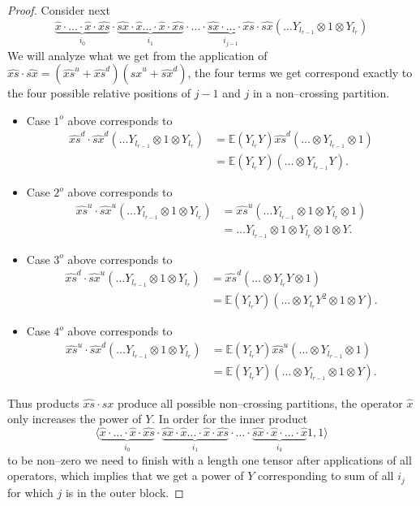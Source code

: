 \documentclass{amsart}
\newcommand{\bE}{\mathbb{E}}
\begin{document}
\begin{proof}
Consider next
\[\underbrace{\widehat{x}\cdot\ldots\cdot \widehat{x} \cdot \widehat{xs}}_{i_0}
 \cdot \underbrace{\widehat{sx}\cdot \widehat{x}\ldots\cdot \widehat{x} \cdot \widehat{xs}}_{i_1}
 \cdot\ldots\cdot \underbrace{\widehat{sx}\cdot\ldots\cdot \widehat{xs} }_{i_{j-1}}\cdot \widehat{sx} (\ldots Y_{l_{r-1}}\otimes 1 \otimes Y_{l_{r}})\]
We will analyze what we get from the application of $\widehat{xs}\cdot \widehat{sx}=(\widehat{xs}^u+\widehat{xs}^d)(\widehat{sx}^u+\widehat{sx}^d)$, the four terms we get correspond exactly to the four possible relative positions of $j-1$ and $j$ in a non--crossing partition.
\begin{itemize}
	\item Case $1^o$ above corresponds to 
	\begin{align*}
		\widehat{xs}^d\cdot \widehat{sx}^d (\ldots Y_{l_{r-1}}\otimes 1 \otimes Y_{l_{r}})&=\bE(Y_{l_{r}}Y)\widehat{xs}^d( \ldots\otimes Y_{l_{r-1}} \otimes 1)\\
		&=\bE(Y_{l_{r}}Y)( \ldots\otimes Y_{l_{r-1}}Y ).
	\end{align*}
	\item Case $2^o$ above corresponds to 
	\begin{align*}
		\widehat{xs}^u\cdot \widehat{sx}^u (\ldots Y_{l_{r-1}}\otimes 1 \otimes Y_{l_{r}})&=\widehat{xs}^u(\ldots Y_{l_{r-1}}\otimes 1 \otimes Y_{l_{r}}\otimes 1)\\
		&=\ldots Y_{l_{r-1}}\otimes 1 \otimes Y_{l_{r}}\otimes 1\otimes Y.
	\end{align*}
	\item Case $3^o$ above corresponds to 
	\begin{align*}
		\widehat{xs}^d\cdot \widehat{sx}^u (\ldots Y_{l_{r-1}}\otimes 1 \otimes Y_{l_{r}})&=\widehat{xs}^d( \ldots\otimes Y_{l_{r}}Y \otimes 1)\\
		&=\bE(Y_{l_{r}}Y)( \ldots\otimes Y_{l_{r}}Y^2 \otimes 1\otimes Y).
	\end{align*}
	\item Case $4^o$ above corresponds to 
	\begin{align*}
		\widehat{xs}^u\cdot \widehat{sx}^d (\ldots Y_{l_{r-1}}\otimes 1 \otimes Y_{l_{r}})&=\bE(Y_{l_{r}}Y)\widehat{xs}^u( \ldots\otimes Y_{l_{r-1}} \otimes 1)\\
		&=\bE(Y_{l_{r}}Y)( \ldots\otimes Y_{l_{r-1}} \otimes 1\otimes Y).
	\end{align*}
\end{itemize}

Thus products  $\widehat{xs}\cdot \widehat{sx}$ produce all possible non--crossing partitions, the operator $\widehat{x}$ only increases the power of $Y$.
 In order for the inner product \[\langle\underbrace{\widehat{x}\cdot\ldots\cdot \widehat{x} \cdot \widehat{xs}}_{i_0} \cdot \underbrace{\widehat{sx}\cdot \widehat{x}\ldots\cdot \widehat{x} \cdot \widehat{xs}}_{i_1}\cdot\ldots\cdot \underbrace{\widehat{sx}\cdot\widehat{x}\cdot\ldots\cdot \widehat{x} }_{i_k} 1,1\rangle\] 
 to be non--zero we need to finish with a length one tensor after applications of all operators, which implies that we get a power of $Y$ corresponding to sum of all $i_j$ for which $j$ is in the outer block.


\end{proof}
\end{document}
